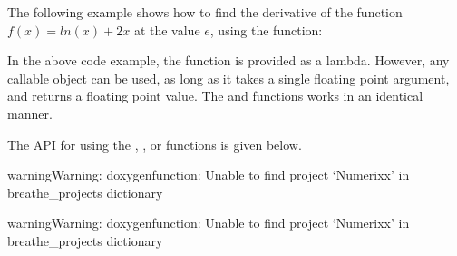 \documentclass[letterpaper,10pt,english]{sphinxmanual}
\begin{document}
\sphinxAtStartPar
The following example shows how to find the derivative of the function \(f(x) = ln(x) + 2x\) at the value \(e\), using the  function:

\begin{sphinxVerbatim}[commandchars=\\\{\}]

\PYG{p}{[}\PYG{p}{]}
\end{sphinxVerbatim}

\sphinxAtStartPar
In the above code example, the function is provided as a lambda. However, any callable object can be used, as long as it takes a single floating point argument, and returns a floating point value. The  and  functions works in an identical manner.

\sphinxAtStartPar
The API for using the , , or  functions is given below.

\begin{sphinxadmonition}{warning}{Warning:}
\sphinxAtStartPar
doxygenfunction: Unable to find project ‘Numerixx’ in breathe\_projects dictionary
\end{sphinxadmonition}

\begin{sphinxadmonition}{warning}{Warning:}
\sphinxAtStartPar
doxygenfunction: Unable to find project ‘Numerixx’ in breathe\_projects dictionary
\end{sphinxadmonition}
\end{document}
